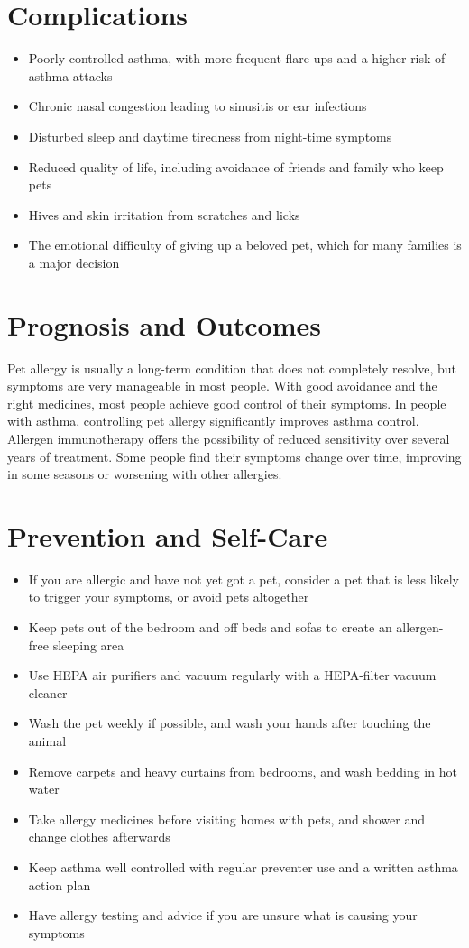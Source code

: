 \section*{Complications}
\begin{itemize}
    \item Poorly controlled asthma, with more frequent flare-ups and a higher risk of asthma attacks
    \item Chronic nasal congestion leading to sinusitis or ear infections
    \item Disturbed sleep and daytime tiredness from night-time symptoms
    \item Reduced quality of life, including avoidance of friends and family who keep pets
    \item Hives and skin irritation from scratches and licks
    \item The emotional difficulty of giving up a beloved pet, which for many families is a major decision
\end{itemize}

\section*{Prognosis and Outcomes}
Pet allergy is usually a long-term condition that does not completely resolve, but symptoms are very manageable in most people. With good avoidance and the right medicines, most people achieve good control of their symptoms. In people with asthma, controlling pet allergy significantly improves asthma control. Allergen immunotherapy offers the possibility of reduced sensitivity over several years of treatment. Some people find their symptoms change over time, improving in some seasons or worsening with other allergies.

\section*{Prevention and Self-Care}
\begin{itemize}
    \item If you are allergic and have not yet got a pet, consider a pet that is less likely to trigger your symptoms, or avoid pets altogether
    \item Keep pets out of the bedroom and off beds and sofas to create an allergen-free sleeping area
    \item Use HEPA air purifiers and vacuum regularly with a HEPA-filter vacuum cleaner
    \item Wash the pet weekly if possible, and wash your hands after touching the animal
    \item Remove carpets and heavy curtains from bedrooms, and wash bedding in hot water
    \item Take allergy medicines before visiting homes with pets, and shower and change clothes afterwards
    \item Keep asthma well controlled with regular preventer use and a written asthma action plan
    \item Have allergy testing and advice if you are unsure what is causing your symptoms
\end{itemize}

